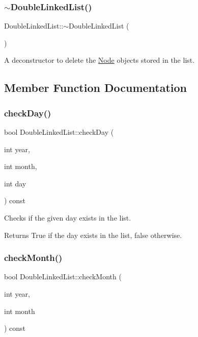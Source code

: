\subsubsection{\texorpdfstring{$\sim$\+Double\+Linked\+List()}{~DoubleLinkedList()}}
{\footnotesize\ttfamily Double\+Linked\+List\+::$\sim$\+Double\+Linked\+List (\begin{DoxyParamCaption}{ }\end{DoxyParamCaption})}



A deconstructor to delete the \hyperlink{class_node}{Node} objects stored in the list. 



\subsection{Member Function Documentation}
\hypertarget{class_double_linked_list_a30a4acb8c596efd5dfa89aee133f58b2}{}\label{class_double_linked_list_a30a4acb8c596efd5dfa89aee133f58b2} 
\subsubsection{\texorpdfstring{check\+Day()}{checkDay()}}
{\footnotesize\ttfamily bool Double\+Linked\+List\+::check\+Day (\begin{DoxyParamCaption}\item[{int}]{year,  }\item[{int}]{month,  }\item[{int}]{day }\end{DoxyParamCaption}) const}



Checks if the given day exists in the list. 

\begin{DoxyReturn}{Returns}
True if the day exists in the list, false otherwise. 
\end{DoxyReturn}
\hypertarget{class_double_linked_list_a5b15624d2284b0bd9bcb5e137242da77}{}\label{class_double_linked_list_a5b15624d2284b0bd9bcb5e137242da77} 
\subsubsection{\texorpdfstring{check\+Month()}{checkMonth()}}
{\footnotesize\ttfamily bool Double\+Linked\+List\+::check\+Month (\begin{DoxyParamCaption}\item[{int}]{year,  }\item[{int}]{month }\end{DoxyParamCaption}) const}



